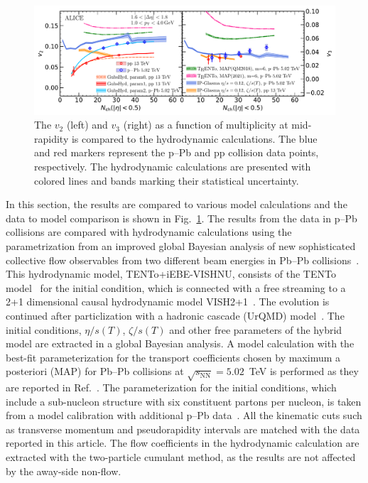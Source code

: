 \begin{figure}[h!]
	\centering
	\includegraphics[width=1.0\textwidth]{figures/Fig6_v2Mult_allSystems_Hydro.pdf} 
	\caption{The $v_2$ (left) and $v_3$ (right) as a function of multiplicity at mid-rapidity is compared to the hydrodynamic calculations. The blue and red markers represent the p--Pb and pp collision data points, respectively. The hydrodynamic calculations are presented with colored lines and bands marking their statistical uncertainty.} 
	\label{fig:vnmult_model}
\end{figure}

In this section, the results are compared to various model calculations and the data to model comparison is shown in Fig.~\ref{fig:vnmult_model}.
The results from the data in p--Pb collisions are compared with hydrodynamic calculations using the parametrization from an improved global
Bayesian analysis of new sophisticated collective flow observables
 from two different beam energies in Pb--Pb collisions~\cite{Parkkila:2021yha}. This hydrodynamic model, {TENTo}+iEBE-VISHNU, consists of the {TENTo} model~\cite{Moreland:2014oya} for the initial condition, which is connected with a free streaming to a 2+1 dimensional causal hydrodynamic model VISH2+1~\cite{Shen:2014vra}. The evolution is continued after particlization with a hadronic cascade (UrQMD) model~\cite{Bass:1998ca,Bleicher:1999xi}. The initial conditions, $\eta/s(T)$, $\zeta/s(T)$ and other free parameters of the hybrid model are extracted in a global Bayesian analysis.
A model calculation with the best-fit parameterization for the transport coefficients chosen by maximum a posteriori (MAP) for Pb--Pb collisions at $\sqrt{s_{\text{NN}}}=5.02$~TeV is performed as they are reported in Ref.~\cite{Parkkila:2021yha}. The parameterization for the initial conditions, which include a sub-nucleon structure with six constituent partons per nucleon, is taken from a model calibration with additional p--Pb data~\cite{Moreland:2018gsh}. All the kinematic cuts such as transverse momentum and pseudorapidity intervals are matched with the data reported in this article. The flow coefficients in the hydrodynamic calculation are extracted with the two-particle cumulant method, as the results are not affected by the away-side non-flow.

